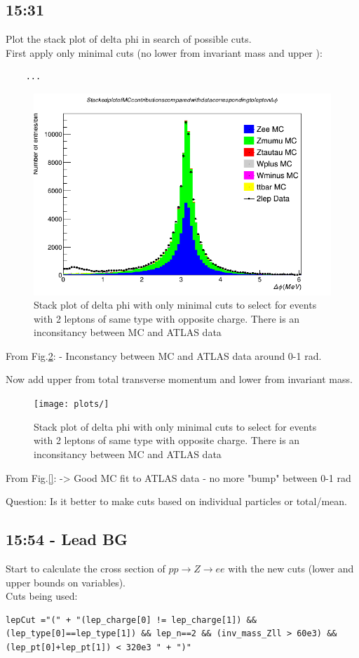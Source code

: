 \subsection*{15:31}
Plot the stack plot of delta phi in search of possible cuts.
\\
First apply only minimal cuts (no lower from invariant mass and upper ):
\begin{lstlisting}
    ...
\end{lstlisting}
\begin{figure}[h!]
    \centering
    \includegraphics[width=0.85\linewidth]{plots/23-02-2021/All-stack-fast_delta-phi_minimal-cuts_0-6_23-02-21_15-30.png}
    \caption{Stack plot of delta phi with only minimal cuts to select for events with 2 leptons of same type with opposite charge.  There is an inconsitancy between MC and ATLAS data}\label{fig:All-stack-fast_delta-phi_minimal-cuts_0-6_23-02-21_15-30}
\end{figure}
From Fig.\ref{fig:All-stack-fast_delta-phi_minimal-cuts_0-6_23-02-21_15-30}:
- Inconstancy between MC and ATLAS data around 0-1 rad.

Now add upper from total transverse momentum and lower from invariant mass.
\begin{figure}[h!]
    \centering
    \texttt{[image: plots/]}
    \caption{Stack plot of delta phi with only minimal cuts to select for events with 2 leptons of same type with opposite charge.  There is an inconsitancy between MC and ATLAS data}\label{fig:All-stack-fast_delta-phi_minimal-cuts_0-6_23-02-21_15-30}
\end{figure}
From Fig.\ref{}:
-> Good MC fit to ATLAS data - no more "bump" between 0-1 rad

Question: Is it better to make cuts based on individual particles or total/mean.


\subsection*{15:54 - Lead BG}
Start to calculate the cross section of $pp \rightarrow Z \rightarrow ee$ with the new cuts (lower and upper bounds on variables).
\\
Cuts being used:
\begin{lstlisting}
lepCut ="(" + "(lep_charge[0] != lep_charge[1]) && (lep_type[0]==lep_type[1]) && lep_n==2 && (inv_mass_Zll > 60e3) && (lep_pt[0]+lep_pt[1]) < 320e3 " + ")"
\end{lstlisting}

